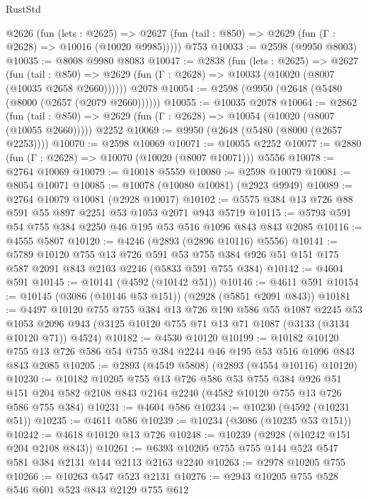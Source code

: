\begin{lexlean}{RustStd}
\begin{coremodule}
    @2626
      (fun (lets : @2625) =>
      @2627 (fun (tail : @850) => @2629 (fun (Γ : @2628) => @10016 (@10020 @9985)))))
    @753
@10033 := @2598 (@9950 @8003)
@10035 := @8008 @9980 @8083
@10047 := @2838
    (fun (lets : @2625) =>
    @2627
      (fun (tail : @850) =>
      @2629 (fun (Γ : @2628) => @10033 (@10020 (@8007 (@10035 @2658 @2660))))))
    @2078
@10054 := @2598 (@9950 (@2648 (@5480 (@8000 (@2657 (@2079 @2660))))))
@10055 := @10035 @2078
@10064 := @2862
    (fun (tail : @850) => @2629 (fun (Γ : @2628) => @10054 (@10020 (@8007 (@10055 @2660)))))
    @2252
@10069 := @9950 (@2648 (@5480 (@8000 (@2657 @2253))))
@10070 := @2598 @10069
@10071 := @10055 @2252
@10077 := @2880 (fun (Γ : @2628) => @10070 (@10020 (@8007 @10071))) @5556
@10078 := @2764 @10069
@10079 := @10018 @5559
@10080 := @2598 @10079
@10081 := @8054 @10071
@10085 := @10078 (@10080 @10081) (@2923 @9949)
@10089 := @2764 @10079 @10081 (@2928 @10017)
@10102 := @5575 @384 @13 @726 @88 @591 @55 @897 @2251 @53 @1053 @2071 @943 @5719
@10115 := @5793 @591 @54 @755 @384 @2250 @46 @195 @53 @516 @1096 @843 @843 @2085
@10116 := @4555 @5807
@10120 := @4246 (@2893 (@2896 @10116) @5556)
@10141 := @5789
    @10120
    @755
    @13
    @726
    @591
    @53
    @755
    @384
    @926
    @51
    @151
    @175
    @587
    @2091
    @843
    @2103
    @2246
    (@5833 @591 @755 @384)
@10142 := @4604 @591
@10145 := @10141 (@4592 (@10142 @51))
@10146 := @4611 @591
@10154 := @10145 (@3086 (@10146 @53 @151)) (@2928 (@5851 @2091 @843))
@10181 := @4497
    @10120
    @755
    @755
    @384
    @13
    @726
    @190
    @586
    @55
    @1087
    @2245
    @53
    @1053
    @2096
    @943
    (@3125 @10120 @755 @71 @13 @71 @1087 (@3133 (@3134 @10120 @71)) @4524)
@10182 := @4530 @10120
@10199 := @10182
    @10120
    @755
    @13
    @726
    @586
    @54
    @755
    @384
    @2244
    @46
    @195
    @53
    @516
    @1096
    @843
    @843
    @2085
@10205 := @2893 (@4549 @5808) (@2893 (@4554 @10116) @10120)
@10230 := @10182
    @10205
    @755
    @13
    @726
    @586
    @53
    @755
    @384
    @926
    @51
    @151
    @204
    @582
    @2108
    @843
    @2164
    @2240
    (@4582 @10120 @755 @13 @726 @586 @755 @384)
@10231 := @4604 @586
@10234 := @10230 (@4592 (@10231 @51))
@10235 := @4611 @586
@10239 := @10234 (@3086 (@10235 @53 @151))
@10242 := @4618 @10120 @13 @726
@10248 := @10239 (@2928 (@10242 @151 @204 @2108 @843))
@10261 := @6393 @10205 @755 @755 @144 @523 @547 @581 @384 @2131 @144 @2113 @2163 @2240
@10263 := @2978 @10205 @755
@10266 := @10263 @547 @523 @2131
@10276 := @2943 @10205 @755 @528 @546 @601 @523 @843 @2129 @755 @612

\end{coremodule}
\end{lexlean}
